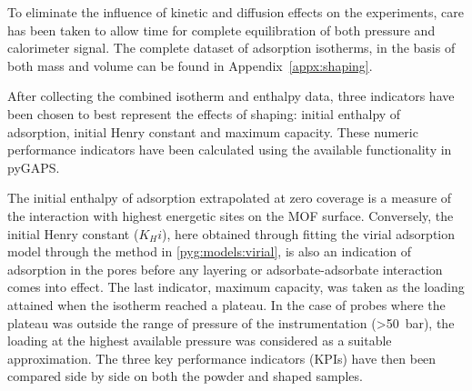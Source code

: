 To eliminate the influence of kinetic and diffusion effects on the experiments,
care has been taken to allow time for complete equilibration of both pressure
and calorimeter signal.
The complete dataset of adsorption isotherms, in the basis of both mass
and volume can be found in Appendix~\ref{appx:shaping}.

After collecting the combined isotherm and enthalpy data, three
indicators have been chosen to best represent the effects of shaping:
initial enthalpy of adsorption, initial Henry constant and maximum capacity.
These numeric performance indicators have been calculated using the
available functionality in pyGAPS.

The initial enthalpy of adsorption extrapolated at zero coverage is
a measure of the interaction with highest energetic sites on the MOF
surface. Conversely, the initial Henry constant (\(K_Hi\)), here obtained through 
fitting the virial adsorption model through the method in
\autoref{pyg:models:virial},
is also an indication of adsorption in the pores before any
layering or adsorbate-adsorbate interaction comes into effect.
The last indicator, maximum capacity, was taken as the loading attained when
the isotherm reached a plateau. In the case of probes where the plateau
was outside the range of pressure of the instrumentation (>\SI{50}{\bar}),
the loading at the highest available pressure was considered as a
suitable approximation.
The three key performance indicators (KPIs) have then been compared side by
side on both the powder and shaped samples.





